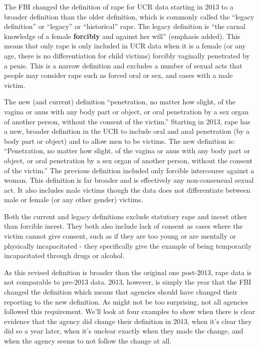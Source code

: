 \documentclass[
  12pt,
  openany]{book}
\begin{document}
The FBI changed the definition of rape for UCR data starting in 2013 to a broader definition than the older definition, which is commonly called the ``legacy definition'' or ``legacy'' or ``historical'' rape. The legacy definition is ``the carnal knowledge of a female \textbf{forcibly} and against her will'' (emphasis added). This means that only rape is only included in UCR data when it is a female (or any age, there is no differentiation for child victims) forcibly vaginally penetrated by a penis. This is a narrow definition and excludes a number of sexual acts that people may consider rape such as forced oral or sex, and cases with a male victim.

The new (and current) definition ``penetration, no matter how slight, of the vagina or anus with any body part or object, or oral penetration by a sex organ of another person, without the consent of the victim.'' Starting in 2013, rape has a new, broader definition in the UCR to include oral and anal penetration (by a body part or object) and to allow men to be victims. The new definition is: ``Penetration, no matter how slight, of the vagina or anus with any body part or object, or oral penetration by a sex organ of another person, without the consent of the victim.'' The previous definition included only forcible intercourse against a woman. This definition is far broader and is effectively any non-consensual sexual act. It also includes male victims though the data does not differentiate between male or female (or any other gender) victims.

Both the current and legacy definitions exclude statutory rape and incest other than forcible incest. They both also include lack of consent as cases where the victim cannot give consent, such as if they are too young or are mentally or physically incapacitated - they specifically give the example of being temporarily incapacitated through drugs or alcohol.

As this revised definition is broader than the original one post-2013, rape data is not comparable to pre-2013 data. 2013, however, is simply the year that the FBI changed the definition which means that agencies should have changed their reporting to the new definition. As might not be too surprising, not all agencies followed this requirement. We'll look at four examples to show when there is clear evidence that the agency did change their definition in 2013, when it's clear they did so a year later, when it's unclear exactly when they made the change, and when the agency seems to not follow the change at all.
\end{document}
